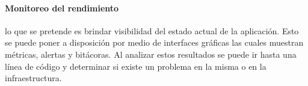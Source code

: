 \documentclass[journal]{IEEEtran}
\begin{document}
\paragraph{Monitoreo del rendimiento} lo que se pretende es brindar visibilidad del estado actual de la aplicación. Esto se puede poner a disposición por medio de interfaces gráficas las cuales muestran métricas, alertas y bitácoras. Al analizar estos resultados se puede ir hasta una línea de código y determinar si existe un problema en la misma o en la infraestructura\cite{humble}.





\ifCLASSOPTIONcaptionsoff
  \newpage
\fi





%
%
%
\end{document}
